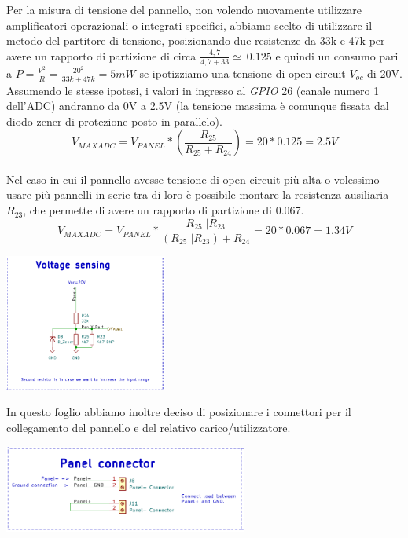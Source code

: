 \noindent Per la misura di tensione del pannello, non volendo nuovamente
utilizzare amplificatori operazionali o integrati specifici, abbiamo
scelto di utilizzare il metodo del partitore di tensione, posizionando
due resistenze da 33k e 47k per avere un rapporto di partizione di circa
\(\frac{4,7}{4,7 + 33} \simeq \ 0.125\) e quindi un consumo pari a 
\(P=\frac{V^{2}}{R}=\frac{20^{2}}{33k+47k}=5mW\)
se ipotizziamo una tensione di open circuit $V_{oc}$ di 20V.\\
Assumendo le stesse ipotesi, i valori in ingresso al
\textit{GPIO} 26 (canale numero 1 dell'ADC) andranno da 0V a 2.5V (la tensione
massima è comunque fissata dal diodo zener di protezione posto in
parallelo).\\
\[V_{MAXADC}=V_{PANEL}*(\frac{R_{25}}{R_{25}+R_{24}})=20*0.125 =2.5 V\]\\
Nel caso in cui il pannello avesse tensione di open circuit più alta o
volessimo usare più pannelli in serie tra di loro è possibile montare la
resistenza ausiliaria $R_{23}$, che permette di avere un rapporto di
partizione di 0.067.\\
\[V_{MAXADC}=V_{PANEL}*\frac{R_{25}||R_{23}}{(R_{25}||R_{23})+R_{24}}=20*0.067 =1.34 V \]

\begin{center}
\includegraphics[width=0.4\textwidth]{figures/image62.png}
\captionsetup{type=figure}
\end{center}

\noindent In questo foglio abbiamo inoltre deciso di posizionare i connettori per
il collegamento del pannello e del relativo carico/utilizzatore.

\begin{center}
\includegraphics[width=0.6\textwidth]{figures/image48.png}
\captionsetup{type=figure}
\end{center}

